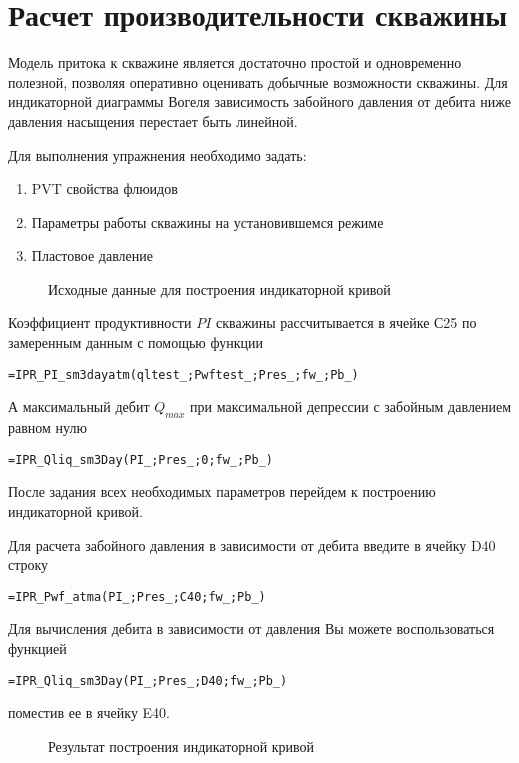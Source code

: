 \section{Расчет производительности скважины}

Модель притока к скважине является достаточно простой и одновременно полезной, позволяя оперативно оценивать добычные возможности скважины. Для индикаторной диаграммы Вогеля зависимость забойного давления от дебита ниже давления насыщения перестает быть линейной.

Для выполнения упражнения необходимо задать:
\begin{enumerate}
	\item PVT свойства флюидов
	\item Параметры работы скважины на установившемся режиме
	\item Пластовое давление
\end{enumerate}


\begin{figure}[h!]
	\center{\texttt{[image: Ex20\_1]}}
	\caption{Исходные данные для построения индикаторной кривой}
	\label{ris:Ex20_1}
\end{figure}

Коэффициент продуктивности $PI$ скважины рассчитывается в ячейке С25 по замеренным данным  с помощью функции

{ \small  \texttt{=IPR\_PI\_sm3dayatm(qltest\_;Pwftest\_;Pres\_;fw\_;Pb\_)}}

А максимальный дебит $Q_{max}$ при максимальной депрессии с забойным давлением равном нулю

{ \small  \texttt{=IPR\_Qliq\_sm3Day(PI\_;Pres\_;0;fw\_;Pb\_)}}

После задания всех необходимых параметров перейдем к построению индикаторной кривой.

Для расчета забойного давления в зависимости от дебита введите в ячейку D40 строку

{ \small  \texttt{=IPR\_Pwf\_atma(PI\_;Pres\_;C40;fw\_;Pb\_)}}

Для вычисления дебита в зависимости от давления Вы можете воспользоваться функцией 

{ \small  \texttt{=IPR\_Qliq\_sm3Day(PI\_;Pres\_;D40;fw\_;Pb\_)}}

поместив ее в ячейку E40.

\begin{figure}[h!]
	\center{\texttt{[image: Ex20\_2]}}
	\caption{Результат построения индикаторной кривой}
	\label{ris:Ex20_2}
\end{figure}

